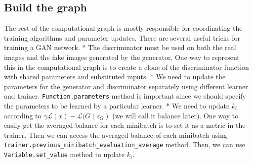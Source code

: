 \documentclass[]{book}
\theoremstyle{definition}
\theoremstyle{definition}
\theoremstyle{definition}
\theoremstyle{remark}
\begin{document}
\subsection{Build the graph}\label{build-the-graph-2}

The rest of the computational graph is mostly responsible for
coordinating the training algorithms and parameter updates. There are
several useful tricks for training a GAN network. * The discriminator
must be used on both the real images and the fake images generated by
the generator. One way to represent this in the computational graph is
to create a clone of the discriminator function with shared parameters
and substituted inputs. * We need to update the parameters for the
generator and discriminator separately using different learner and
trainer. \texttt{Function.parameters} method is important since we
should specify the parameters to be learned by a particular learner. *
We need to update \(k_t\) according to
\(\gamma \mathcal{L}(x)-\mathcal{L}(G(z_G)\) (we will call it balance
later). One way to easily get the averaged balance for each minibatch is
to set it as a metric in the trainer. Then we can access the averaged
balance of each minibatch using
\texttt{Trainer.previous\_minibatch\_evaluation\_average} method. Then,
we can use \texttt{Variable.set\_value} method to update \(k_t\).
\end{document}
